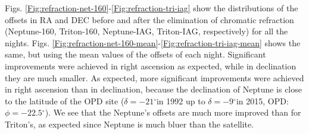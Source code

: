 \documentclass[12pt,a4paper]{report}
\newcommand{\PE}{Perkin-Elmer }
\newcommand{\BC}{Boller \& Chivens }
\newcommand{\degr}{\ensuremath{^{\circ}}}%
\begin{document}
Figs. \ref{Fig:refraction-net-160}-\ref{Fig:refraction-tri-iag} show the distributions of the offsets in RA and DEC before and after the elimination of chromatic refraction (Neptune-160, Triton-160, Neptune-IAG, Triton-IAG, respectively) for all the nights. Figs. \ref{Fig:refraction-net-160-mean}-\ref{Fig:refraction-tri-iag-mean} shows the same, but using the mean values of the offsets of each night. Significant improvements were achieved in right ascension as expected, while in declination they are much smaller. As expected, more significant improvements were achieved in right ascension than in declination, because the declination of Neptune is close to the latitude of the OPD site ($\delta = -21$\degr in 1992 up to $\delta = -9$\degr in 2015, OPD: $\phi = -22.5$\degr).
We see that the Neptune's offsets are much more improved than for Triton's, as expected since Neptune is much bluer than the satellite. %


\end{document}
